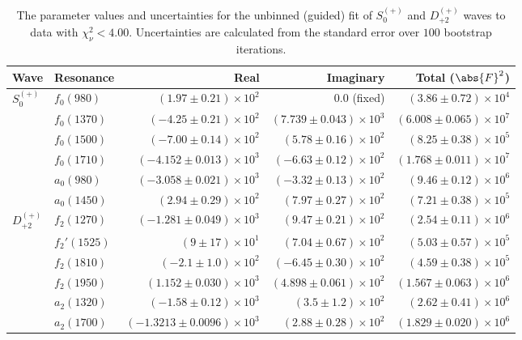 \begin{table}[ht]
    \begin{center}
        \begin{tabular}{llrrr}\toprule
        Wave & Resonance & Real & Imaginary & Total ($\abs{F}^2$) \\\midrule
$S_{0}^{(+)}$ & $f_{0}(980)$ & $(1.97 \pm 0.21) \times 10^{2}$ & $0.0$ (fixed) & $(3.86 \pm 0.72) \times 10^{4}$ \\
 & $f_{0}(1370)$ & $(-4.25 \pm 0.21) \times 10^{2}$ & $(7.739 \pm 0.043) \times 10^{3}$ & $(6.008 \pm 0.065) \times 10^{7}$ \\
 & $f_{0}(1500)$ & $(-7.00 \pm 0.14) \times 10^{2}$ & $(5.78 \pm 0.16) \times 10^{2}$ & $(8.25 \pm 0.38) \times 10^{5}$ \\
 & $f_{0}(1710)$ & $(-4.152 \pm 0.013) \times 10^{3}$ & $(-6.63 \pm 0.12) \times 10^{2}$ & $(1.768 \pm 0.011) \times 10^{7}$ \\
 & $a_{0}(980)$ & $(-3.058 \pm 0.021) \times 10^{3}$ & $(-3.32 \pm 0.13) \times 10^{2}$ & $(9.46 \pm 0.12) \times 10^{6}$ \\
 & $a_{0}(1450)$ & $(2.94 \pm 0.29) \times 10^{2}$ & $(7.97 \pm 0.27) \times 10^{2}$ & $(7.21 \pm 0.38) \times 10^{5}$ \\
$D_{+2}^{(+)}$ & $f_{2}(1270)$ & $(-1.281 \pm 0.049) \times 10^{3}$ & $(9.47 \pm 0.21) \times 10^{2}$ & $(2.54 \pm 0.11) \times 10^{6}$ \\
 & $f_{2}'(1525)$ & $(9 \pm 17) \times 10^{1}$ & $(7.04 \pm 0.67) \times 10^{2}$ & $(5.03 \pm 0.57) \times 10^{5}$ \\
 & $f_{2}(1810)$ & $(-2.1 \pm 1.0) \times 10^{2}$ & $(-6.45 \pm 0.30) \times 10^{2}$ & $(4.59 \pm 0.38) \times 10^{5}$ \\
 & $f_{2}(1950)$ & $(1.152 \pm 0.030) \times 10^{3}$ & $(4.898 \pm 0.061) \times 10^{2}$ & $(1.567 \pm 0.063) \times 10^{6}$ \\
 & $a_{2}(1320)$ & $(-1.58 \pm 0.12) \times 10^{3}$ & $(3.5 \pm 1.2) \times 10^{2}$ & $(2.62 \pm 0.41) \times 10^{6}$ \\
 & $a_{2}(1700)$ & $(-1.3213 \pm 0.0096) \times 10^{3}$ & $(2.88 \pm 0.28) \times 10^{2}$ & $(1.829 \pm 0.020) \times 10^{6}$ \\\bottomrule
        \end{tabular}
    \caption{The parameter values and uncertainties for the unbinned (guided) fit of $S_{0}^{(+)}$ and $D_{+2}^{(+)}$ waves to data with $\chi^2_\nu < 4.00$. Uncertainties are calculated from the standard error over $100$ bootstrap iterations.}\label{tab:unbinned-fit-chisqdof-4.0-guided-Sp0p-Dp2p}
    \end{center}
\end{table}
